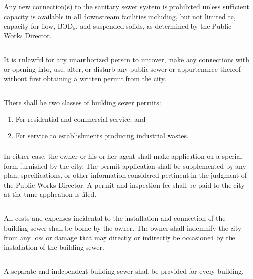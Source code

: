 \subsection{}
Any new connection(s) to the sanitary sewer system is prohibited unless sufficient capacity is available in all downstream facilities including, but not limited to, capacity for flow, BOD$_{5}$, and suspended solids, as determined by the Public Works Director.
\subsection{}
It is unlawful for any unauthorized person to uncover, make any connections with or opening into, use, alter, or disturb any public sewer or appurtenance thereof without first obtaining a written permit from the city.
\subsection{}
\subsubsection{}
There shall be two classes of building sewer permits:
\begin{enumerate}[{\indent}a)]
    \item For residential and commercial service; and
    \item For service to establishments producing industrial wastes.
\end{enumerate}
\subsubsection{}
In either case, the owner or his or her agent shall make application on a special form furnished by the city.  The permit application shall be supplemented by any plan, specifications, or other information considered pertinent in the judgment of the Public Works Director.  A permit and inspection fee shall be paid to the city at the time application is filed.
\subsection{}
All costs and expenses incidental to the installation and connection of the building sewer shall be borne by the owner.  The owner shall indemnify the city from any loss or damage that may directly or indirectly be occasioned by the installation of the building sewer.
\subsection{}
A separate and independent building sewer shall be provided for every building.
